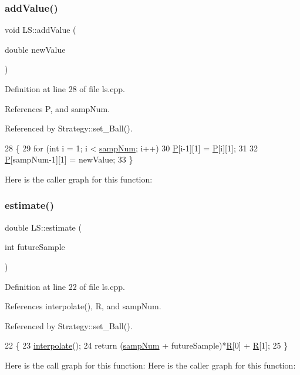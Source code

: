 \subsubsection{\texorpdfstring{add\+Value()}{addValue()}}
{\footnotesize\ttfamily void L\+S\+::add\+Value (\begin{DoxyParamCaption}\item[{double}]{new\+Value }\end{DoxyParamCaption})}



Definition at line 28 of file ls.\+cpp.



References P, and samp\+Num.



Referenced by Strategy\+::set\+\_\+\+Ball().


\begin{DoxyCode}
28                                  \{
29     \textcolor{keywordflow}{for} (\textcolor{keywordtype}{int} i = 1; i < \hyperlink{class_l_s_a333c6e0be784cffd2f97f46803c5ba15}{sampNum}; i++)
30         \hyperlink{class_l_s_aef5aafb3950204592111d32c93721aa3}{P}[i-1][1] = \hyperlink{class_l_s_aef5aafb3950204592111d32c93721aa3}{P}[i][1];
31 
32     \hyperlink{class_l_s_aef5aafb3950204592111d32c93721aa3}{P}[sampNum-1][1] = newValue;
33 \}
\end{DoxyCode}
Here is the caller graph for this function\+:
\mbox{\label{class_l_s_a595c287e25fe0d0d51e7f06a80f8f991}} 
\subsubsection{\texorpdfstring{estimate()}{estimate()}}
{\footnotesize\ttfamily double L\+S\+::estimate (\begin{DoxyParamCaption}\item[{int}]{future\+Sample }\end{DoxyParamCaption})}



Definition at line 22 of file ls.\+cpp.



References interpolate(), R, and samp\+Num.



Referenced by Strategy\+::set\+\_\+\+Ball().


\begin{DoxyCode}
22                                     \{
23     \hyperlink{class_l_s_a1657c109024e802aee886d293778079f}{interpolate}();
24     \textcolor{keywordflow}{return} (\hyperlink{class_l_s_a333c6e0be784cffd2f97f46803c5ba15}{sampNum} + futureSample)*\hyperlink{class_l_s_ade8c978a7d99f10950790c0dfec9f556}{R}[0] + \hyperlink{class_l_s_ade8c978a7d99f10950790c0dfec9f556}{R}[1];
25 \}
\end{DoxyCode}
Here is the call graph for this function\+:
Here is the caller graph for this function\+:
\mbox{\label{class_l_s_adbbd5b95ea2c0585098ddb6ea7ddeabc}} 
